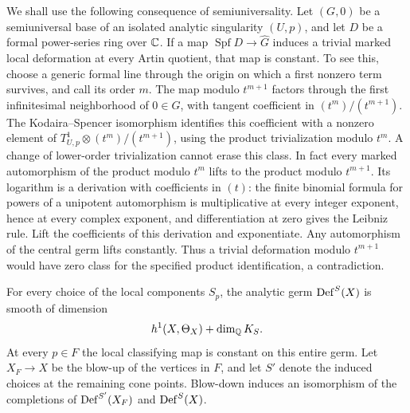 We shall use the following consequence of semiuniversality. Let $(G,0)$
be a semiuniversal base of an isolated analytic singularity $(U,p)$,
and let $D$ be a formal power-series ring over $\mathbb C$. If a map
$\operatorname{Spf}D\to\widehat G$ induces a trivial marked local
deformation at every Artin quotient, that map is constant. To see this,
choose a generic formal line through the origin on which a first nonzero
term survives, and call its order $m$. The map modulo $t^{m+1}$ factors
through the first infinitesimal neighborhood of $0\in G$, with tangent
coefficient in $(t^m)/(t^{m+1})$. The Kodaira--Spencer isomorphism
identifies this coefficient with a nonzero element of
$T^1_{U,p}\otimes (t^m)/(t^{m+1})$, using the product trivialization
modulo $t^m$. A change of lower-order trivialization cannot erase this
class. In fact every marked automorphism of the product modulo $t^m$
lifts to the product modulo $t^{m+1}$. Its logarithm is a derivation
with coefficients in $(t)$: the finite binomial formula for powers of a
unipotent automorphism is multiplicative at every integer exponent,
hence at every complex exponent, and differentiation at zero gives
the Leibniz rule. Lift the coefficients of this derivation and
exponentiate. Any automorphism of the central germ lifts constantly.
Thus a trivial deformation modulo $t^{m+1}$ would have zero class for
the specified product identification, a contradiction.

\begin{theorem}\label{thm:regular}
For every choice of the local components $S_p$, the analytic germ
$\operatorname{Def}^S(X)$ is smooth of dimension
\[
 h^1(X,\Theta_X)+\dim_{\mathbb Q} K_S.
\]
At every $p\in F$ the local classifying map is constant on this entire
germ. Let $X_F\to X$ be the blow-up of the vertices in $F$, and let
$S'$ denote the induced choices at the remaining cone points.
Blow-down induces an isomorphism of the completions of
$\operatorname{Def}^{S'}(X_F)$ and $\operatorname{Def}^S(X)$.
\end{theorem}

